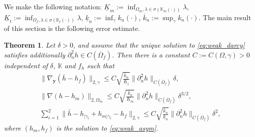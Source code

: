 \documentclass[a4paper]{article}
\newtheorem{theorem}{Theorem}
\def\vc#1{\mathbf{\boldsymbol{#1}}}     %
\def\tn#1{{\mathbb{#1}}}    %
\def\norm#1{\|#1\|}
\def\yy{{\vc y}}
\begin{document}
We make the following notation:
$\underline K_m := \inf_{\Omega_m,\lambda\in\sigma(\tn K_m(\cdot))}\lambda$, $\underline K_t := \inf_{\Omega_f,\lambda\in\sigma(\tn K_t(\cdot))}\lambda$, $\underline k_n:=\inf_{\gamma}k_n(\cdot)$, $\overline k_n:=\sup_{\gamma}k_n(\cdot)$.
The main result of this section is the following error estimate.
\begin{theorem}
\label{th:error_estimate}
Let $\delta>0$, and assume that the unique solution to \eqref{eq:weak_darcy} satisfies additionally $\partial_n^2 h\in C(\overline\Omega_f)$.
Then there is a constant $C:=C(\Omega,\gamma)>0$ independent of $\delta$, $\tn K$ and $f_h$ such that
\begin{subequations}
\label{eq:error_estimates_delta}
\begin{align}
&\norm{\nabla_\yy(\bar h- h_f)}_{2,\gamma} \le C\sqrt{\frac{\overline k_n}{\underline K_t}}\norm{\partial_n^2 h}_{C(\overline\Omega_f)}\delta,\\
&\norm{\nabla(h-h_m)}_{2,\Omega_m} \le C\sqrt{\frac{\overline k_n}{\underline K_m}}\norm{\partial_n^2 h}_{C(\overline\Omega_f)}\delta^{3/2},\\
&\sum_{i=1}^2\norm{\bar h-h_{|\gamma_i}+h_{m|\gamma_i}-h_f}_{2,\gamma} \le C\sqrt{\frac{\overline k_n}{\underline k_n}}\norm{\partial_n^2 h}_{C(\overline\Omega_f)}\delta^2,
\end{align}
\end{subequations}
where $(h_m,h_f)$ is the solution to \eqref{eq:weak_asym}.
\end{theorem}
\end{document}
